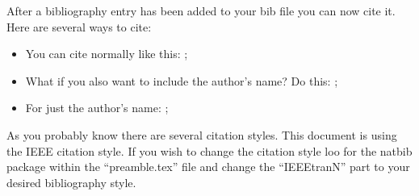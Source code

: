 After a bibliography entry has been added to your bib file you can now cite it. Here are several ways to cite:

\begin{itemize}
	\item You can cite normally like this: \cite{reynaud22_iberspeech};
	\item What if you also want to include the author's name? Do this: \citet{reynaud22_iberspeech};
	\item For just the author's name: \citeauthor{reynaud22_iberspeech};
\end{itemize} 

\begin{tcolorbox}[title=A note on citations]
	As you probably know there are several citation styles. This document is using the IEEE citation style. If you wish to change the citation style loo for the natbib package within the ``preamble.tex'' file and change the ``IEEEtranN'' part to your desired bibliography style.
\end{tcolorbox}


